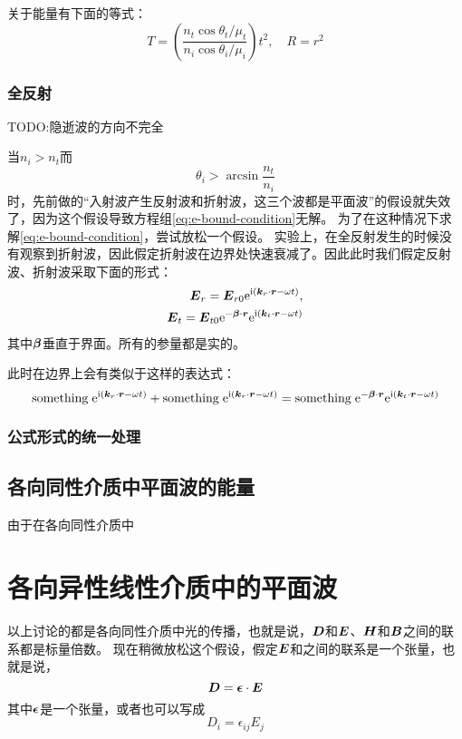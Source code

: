 \documentclass[UTF8, a4paper]{ctexart}
\newcommand*{\ii}{\mathrm{i}}
\newcommand*{\ee}{\mathrm{e}}
\begin{document}
关于能量有下面的等式：
\begin{equation}
    T = \left( \frac{n_t \cos \theta_t / \mu_t}{n_i \cos \theta_i / \mu_i} \right) t^2, \quad R = r^2
\end{equation}

\subsubsection{全反射}\label{sec:total-reflect}

TODO:隐逝波的方向不完全

当$n_i > n_t$而
\[
    \theta_i > \arcsin \frac{n_t}{n_i}
\]
时，先前做的“入射波产生反射波和折射波，这三个波都是平面波”的假设就失效了，因为这个假设导致方程组\eqref{eq:e-bound-condition}无解。
为了在这种情况下求解\eqref{eq:e-bound-condition}，尝试放松一个假设。
实验上，在全反射发生的时候没有观察到折射波，因此假定折射波在边界处快速衰减了。因此此时我们假定反射波、折射波采取下面的形式：
\[
    \begin{split}
        \vb*{E}_r = \vb*{E}_{r0} \ee^{\ii (\vb*{k}_r \cdot \vb*{r} - \omega t)}, \\
        \vb*{E}_t = \vb*{E}_{t0} \ee^{-\vb*{\beta} \cdot \vb*{r}} \ee^{\ii (\vb*{k}_t \cdot \vb*{r} - \omega t)}
    \end{split}
\]
其中$\vb*{\beta}$垂直于界面。所有的参量都是实的。

此时在边界上会有类似于这样的表达式：
\[
    \mathrm{something} \; \ee^{\ii (\vb*{k}_r \cdot \vb*{r} - \omega t)} + \mathrm{something} \; \ee^{\ii (\vb*{k}_r \cdot \vb*{r} - \omega t)} = \mathrm{something} \; \ee^{-\vb*{\beta} \cdot \vb*{r}} \ee^{\ii (\vb*{k}_t \cdot \vb*{r} - \omega t)}
\]

\subsubsection{公式形式的统一处理}

\subsection{各向同性介质中平面波的能量}

由于在各向同性介质中

\section{各向异性线性介质中的平面波}

以上讨论的都是各向同性介质中光的传播，也就是说，$\vb*{D}$和$\vb*{E}$、$\vb*{H}$和$\vb*{B}$之间的联系都是标量倍数。
现在稍微放松这个假设，假定$\vb*{E}$和之间的联系是一个张量，也就是说，
\[
    \vb*{D} = \vb*{\epsilon} \cdot \vb*{E}
\]
其中$\vb*{\epsilon}$是一个张量，或者也可以写成
\[
    D_i = \epsilon_{ij} E_j
\]
\end{document}
